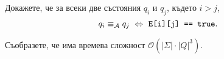 \begin{problem}
  Докажете, че за всеки две състояния $q_i$ и $q_j$, където $i > j$,
  \[q_i \equiv_{\mathcal{A}} q_j \ \Leftrightarrow\  \texttt{E[i][j] == true}.\]
\end{problem}

\begin{problem}
  Съобразете, че  има времева сложност $\mathcal{O}(|\Sigma| \cdot |Q|^3)$.
\end{problem}


